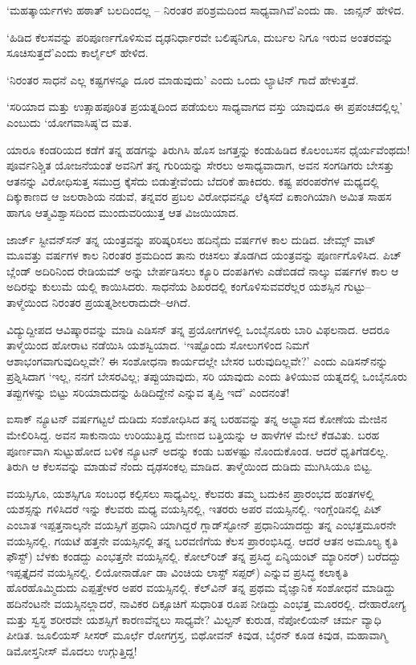 \vskip 1pt

‘ಮಹತ್ಕಾರ್ಯಗಳು ಹಠಾತ್ ಬಲದಿಂದಲ್ಲ – ನಿರಂತರ ಪರಿಶ್ರಮದಿಂದ ಸಾಧ್ಯವಾಗಿವೆ’\break ಎಂದು ಡಾ.\ ಜಾನ್ಸನ್ ಹೇಳಿದ.

\vskip 1pt

‘ಹಿಡಿದ ಕೆಲಸವನ್ನು ಪರಿಪೂರ್ಣಗೊಳಿಸುವ ದೃಢನಿರ್ಧಾರವೇ ಬಲಿಷ್ಠನಿಗೂ, ದುರ್ಬಲ ನಿಗೂ ಇರುವ ಅಂತರವನ್ನು ಸೂಚಿಸುತ್ತದೆ’ಎಂದು ಕಾರ್ಲೈಲ್ ಹೇಳಿದ.

‘ನಿರಂತರ ಸಾಧನೆ ಎಲ್ಲ ಕಷ್ಟಗಳನ್ನೂ ದೂರ ಮಾಡುವುದು’ ಎಂದು ಒಂದು ಲ್ಯಾಟಿನ್ ಗಾದೆ ಹೇಳುತ್ತದೆ.

‘ಸರಿಯಾದ ಮತ್ತು ಉತ್ಸಾಹಪೂರಿತ ಪ್ರಯತ್ನದಿಂದ ಪಡೆಯಲು ಸಾಧ್ಯವಾಗದ ವಸ್ತು ಯಾವುದೂ ಈ ಪ್ರಪಂಚದಲ್ಲಿಲ್ಲ’ ಎಂಬುದು ‘ಯೋಗವಾಸಿಷ್ಠ’ದ ಮತ.

ಯಾರೂ ಕಂಡರಿಯದ ಕಡೆಗೆ ತನ್ನ ಹಡಗನ್ನು ತಿರುಗಿಸಿ ಹೊಸ ಜಗತ್ತನ್ನು ಕಂಡುಹಿಡಿದ ಕೊಲಂಬಸನ ಧೈರ್ಯವೆಂಥದು! ಪೂರ್ವನಿಶ್ಚಿತ ಯೋಜನೆಯಂತೆ ಅವನಿಗೆ ತನ್ನ ಗುರಿಯನ್ನು ಸೇರಲು ಅಸಾಧ್ಯವಾದಾಗ, ಅವನ ಸಂಗಡಿಗರು ಬೇಸತ್ತು ಆತನನ್ನು ವಿರೋಧಿಸುತ್ತ ಸಮುದ್ರ ಕ್ಕೆಸೆದು ಬಿಡುತ್ತೇವೆಂದು ಬೆದರಿಕೆ ಹಾಕಿದರು. ಕಷ್ಟ ಪರಂಪರೆಗಳ ಮಧ್ಯದಲ್ಲಿ ದಿಕ್ಕುಕಾಣದ ಆ ಜಲರಾಶಿಯ ನಡುವೆ, ತನ್ನವರ ಪ್ರಬಲ ವಿರೋಧವನ್ನೂ ಲೆಕ್ಕಿಸದೆ ಏಕಾಂಗಿಯಾಗಿ ಅಮಿತ ಸಾಹಸ ಹಾಗೂ ಆತ್ಮವಿಶ್ವಾಸದಿಂದ ಮುಂದುವರಿಯುತ್ತ ಆತ ವಿಜಯಿಯಾದ.

ಜಾರ್ಜ್ ಸ್ಟೀವನ್​ಸನ್ ತನ್ನ ಯಂತ್ರವನ್ನು ಪರಿಷ್ಕರಿಸಲು ಹದಿನೈದು ವರ್ಷಗಳ ಕಾಲ ದುಡಿದ. ಜೇಮ್ಸ್​ ವಾಟ್ ಮೂವತ್ತು ವರ್ಷಗಳ ಕಾಲ ನಿರಂತರ ಶ್ರಮದಿಂದ ತಾನು ರಚಿಸಲು ತೊಡಗಿದ ಯಂತ್ರವನ್ನು ಪೂರ್ಣಗೊಳಿಸಿದ. ಪಿಚ್ ಬ್ಲೆಂಡ್ ಅದಿರಿನಿಂದ ರೇಡಿಯಮ್ ಅನ್ನು ಬೇರ್ಪಡಿಸಲು ಕ್ಯೂರಿ ದಂಪತಿಗಳು ಎಡೆಬಿಡದೆ ನಾಲ್ಕು ವರ್ಷಗಳ ಕಾಲ ಆ ಅದಿರನ್ನು ಕುಲುಮೆ ಯಲ್ಲಿ ಕಾಯಿಸಿದರು. ಸಾಧನೆಯ ಶಿಖರದಲ್ಲಿ ಕಂಗೊಳಿಸುವವರೆಲ್ಲರ ಯಶಸ್ಸಿನ ಗುಟ್ಟು– ತಾಳ್ಮೆಯಿಂದ ನಿರಂತರ ಪ್ರಯತ್ನಶೀಲರಾದುದೇ–ಆಗಿದೆ.

ವಿದ್ಯುದ್ದೀಪದ ಆವಿಷ್ಕಾರವನ್ನು ಮಾಡಿ ಎಡಿಸನ್ ತನ್ನ ಪ್ರಯೋಗಗಳಲ್ಲಿ ಒಂಬೈನೂರು ಬಾರಿ ವಿಫಲನಾದ. ಆದರೂ ತಾಳ್ಮೆಯಿಂದ ಹೋರಾಟ ನಡೆಯಿಸಿ ಯಶಸ್ವಿಯಾದ. ‘ಇಷ್ಟೊಂದು ಸೋಲುಗಳಿಂದ ನಿಮಗೆ ಆಶಾಭಂಗವಾಗುವುದಿಲ್ಲವೇ? ಈ ಸಂಶೋಧನಾ ಕಾರ್ಯದಲ್ಲೇ ಬೇಸರ ಬರುವುದಿಲ್ಲವೇ?’ ಎಂದು ಎಡಿಸನ್​ನನ್ನು ಪ್ರಶ್ನಿಸಿದಾಗ ‘ಇಲ್ಲ, ನನಗೆ ಬೇಸರವಿಲ್ಲ; ತಪ್ಪು\break ಯಾವುದು, ಸರಿ ಯಾವುದು ಎಂದು ತಿಳಿಯುವ ಯತ್ನದಲ್ಲಿ ಒಂಬೈನೂರು ತಪ್ಪುಗಳನ್ನು ಬಿಟ್ಟು ಸರಿಯಾದುದನ್ನು ಹಿಡಿದಿದ್ದೇನೆ ಎನ್ನುವ ತೃಪ್ತಿ ಇದೆ’ ಎಂದನಂತೆ!

ಐಸಾಕ್ ನ್ಯೂಟನ್ ವರ್ಷಗಟ್ಟಲೆ ದುಡಿದು ಸಂಶೋಧಿಸಿದ ತನ್ನ ಬರಹವನ್ನು ತನ್ನ ಅಭ್ಯಾಸದ ಕೋಣೆಯ ಮೇಜಿನ ಮೇಲಿರಿಸಿದ್ದ. ಅವನ ಸಾಕುನಾಯಿ ಉರಿಯುತ್ತಿದ್ದ ಮೇಣದ ಬತ್ತಿಯನ್ನು ಆ ಹಾಳೆಗಳ ಮೇಲೆ ಕೆಡವಿತು. ಬರಹ ಪೂರ್ಣವಾಗಿ ಸುಟ್ಟುಹೋದ ಬಳಿಕ ನ್ಯೂಟನ್ ಅದನ್ನು ಕಂಡು ಬಹಳಷ್ಟು ನೊಂದುಕೊಂಡ. ಆದರೆ ಧೃತಿಗೆಡಲಿಲ್ಲ. ತಿರುಗಿ ಆ ಕೆಲಸವನ್ನು ಮಾಡುವೆ ನೆಂದು ದೃಢಸಂಕಲ್ಪ ಮಾಡಿದ. ತಾಳ್ಮೆಯಿಂದ ದುಡಿದು ಮುಗಿಸಿಯೂ ಬಿಟ್ಟ.

ವಯಸ್ಸಿಗೂ, ಯಶಸ್ಸಿಗೂ ಸಂಬಂಧ ಕಲ್ಪಿಸಲು ಸಾಧ್ಯವಿಲ್ಲ. ಕೆಲವರು ತಮ್ಮ ಬದುಕಿನ ಪ್ರಾರಂಭದ ಹಂತಗಳಲ್ಲಿ ಯಶಸ್ಸನ್ನು ಗಳಿಸಿದರೆ ಇನ್ನು ಕೆಲವರು ಮಧ್ಯ ವಯಸ್ಸಿನಲ್ಲಿ, ಇತರರು ಅಪರ ವಯಸ್ಸಿನಲ್ಲಿ. ಇಂಗ್ಲೆಂಡಿನಲ್ಲಿ ಪಿಟ್ ಎಂಬಾತ ಇಪ್ಪತ್ತನಾಲ್ಕನೇ ವಯಸ್ಸಿಗೆ ಪ್ರಧಾನಿ ಯಾಗಿದ್ದರೆ ಗ್ಲಾಡ್​ಸ್ಟೋನ್ ಪ್ರಧಾನಿಯಾದದ್ದು ತನ್ನ ಎಂಭತ್ತಮೂರನೇ ವಯಸ್ಸಿನಲ್ಲಿ. ಗಯಟೆ ಹತ್ತನೇ ವಯಸ್ಸಿನಲ್ಲಿ ತನ್ನ ಬರವಣಿಗೆಯ ಕೆಲಸ ಪ್ರಾರಂಭಿಸಿದ್ದ. ಆದರೆ ಆತನ ಅಮೂಲ್ಯ ಕೃತಿ ಫೌಸ್ಟ್​) ಬೆಳಕು ಕಂಡದ್ದು ಎಂಭತ್ತನೇ ವಯಸ್ಸಿನಲ್ಲಿ. ಕೋಲ್​ರಿಜ್ ತನ್ನ ಪ್ರಸಿದ್ಧ ಏನ್ಶಿಯಂಟ್ ಮ್ಯಾರಿನರ್​) ಬರೆದದ್ದು ಇಪ್ಪತ್ತೈದನೆ ವಯಸ್ಸಿನಲ್ಲಿ. ಲಿಯೋನಾರ್ಡೊ ಡಾ ವಿಂಚಿಯ ಲಾಸ್ಟ್ ಸಪ್ಪರ್​) ಎನ್ನುವ ಪ್ರಸಿದ್ಧ ಕಲಾಕೃತಿ ಹೊರಹೊಮ್ಮಿದುದು ಎಪ್ಪತ್ತೇಳರ ಅಪರ ವಯಸ್ಸಿನಲ್ಲಿ. ಕೆಲ್​ವಿನ್ ತನ್ನ ಪ್ರಥಮ ವೈಜ್ಞಾನಿಕ ಸಂಶೋಧನೆ ಮಾಡಿದ್ದು ಹದಿನೆಂಟನೇ ವಯಸ್ಸಿನಲ್ಲಾದರೆ, ನಾವಿಕರ ದಿಕ್ಸೂಚಿಗೆ ಸುಧಾರಿತ ರೂಪ ನೀಡಿದ್ದು ಎಂಭತ್ತ ಮೂರರಲ್ಲಿ. ದೇಹಾರೋಗ್ಯ ಮತ್ತು ಸ್ವಸ್ಥ ಶರೀರವೇ ಯಶಸ್ಸಿಗೆ ಕಾರಣವೆನ್ನಲು ಸಾಧ್ಯವೇ? ಮಿಲ್ಟನ್ ಕುರುಡ, ನೆಪೋಲಿಯನ್ ಚರ್ಮ ವ್ಯಾಧಿ ಪೀಡಿತ. ಜೂಲಿಯಸ್ ಸೀಸರ್ ಮೂರ್ಛೆ ರೋಗಗ್ರಸ್ತ, ಬಿಥೋವನ್ ಕಿವುಡ, ಬೈರನ್ ಕೂಡ ಕಿವುಡ, ಮಹಾವಾಗ್ಮಿ ಡಿಮೋಸ್ತನೀಸ್ ಮೊದಲು ಉಗ್ಗುತ್ತಿದ್ದ!


